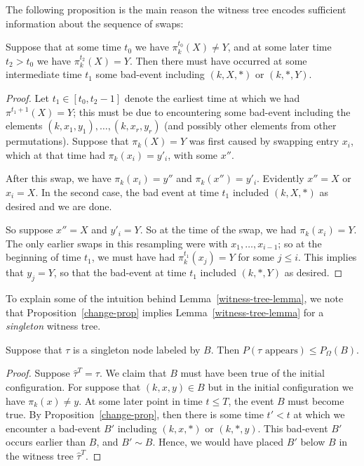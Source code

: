 The following proposition is the main reason the witness tree encodes sufficient information about the sequence of swaps:
\begin{proposition}
\label{change-prop}
Suppose that at some time $t_0$ we have $\pi^{t_0}_k(X) \neq Y$, and at some later time $t_2 > t_0$ we have $\pi^{t_2}_k(X) = Y$. Then there must have occurred at some intermediate time $t_1$ some bad-event including $(k, X,*)$ or $(k, *, Y)$.
\end{proposition}
\begin{proof}
Let $t_1 \in [t_0, t_2 - 1]$ denote the earliest time at which we had $\pi^{t_1+1}(X) = Y$; this must be due to encountering some bad-event including the elements $(k,x_1, y_1), \dots, (k,x_r,y_r)$ (and possibly other elements from other permutations). Suppose that $\pi_k(X) = Y$ was first caused by swapping entry $x_i$, which at that time had $\pi_k(x_i) = y'_i$, with some $x''$.

After this swap, we have $\pi_k(x_i) = y''$ and $\pi_k(x'') = y'_i$. Evidently $x'' = X$ or $x_i = X$. In the second case, the bad event at time $t_1$ included $(k, X, *)$ as desired and we are done.

So suppose $x''  = X$ and $y'_i = Y$. So at the time of the swap, we had $\pi_k(x_i) = Y$. The only earlier swaps in this resampling were with $x_1, \dots, x_{i-1}$; so at the beginning of time $t_1$, we must have had $\pi^{t_1}_k(x_j) = Y$ for some $j \leq i$. This implies that $y_j = Y$, so that the bad-event at time $t_1$ included $(k,*,Y)$ as desired.
\end{proof}

To explain some of the intuition behind Lemma~\ref{witness-tree-lemma}, we note that Proposition~\ref{change-prop} implies Lemma~\ref{witness-tree-lemma} for a \emph{singleton} witness tree.
\begin{corollary}
Suppose that $\tau$ is a singleton node labeled by $B$. Then $P(\text{$\tau$ appears}) \leq P_{\Omega}(B)$.
\end{corollary}
\begin{proof}
Suppose $\hat \tau^T = \tau$. We claim that $B$ must have been true of the initial configuration. For suppose that $(k, x,y) \in B$ but in the initial configuration we have $\pi_k(x) \neq y$. At some later point in time $t \leq T$, the event $B$ must become true. By Proposition~\ref{change-prop}, then there is some time $t' < t$ at which we encounter a bad-event $B'$ including $(k,x,*)$ or $(k,*,y)$. This bad-event $B'$ occurs earlier than $B$, and $B' \sim B$. Hence, we would have placed $B'$ below $B$ in the witness tree $\hat \tau^T$.
\end{proof}


